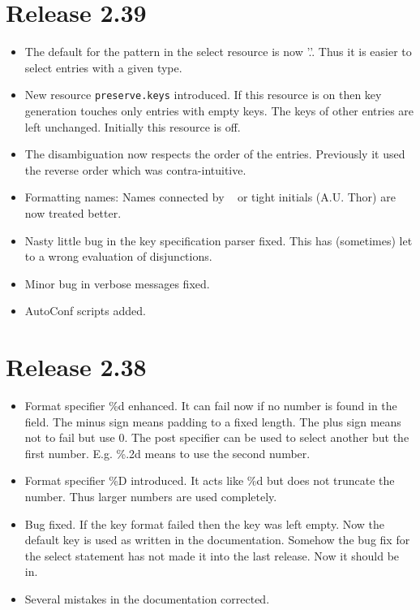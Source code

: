 \documentclass[11pt,a4paper]{scrartcl}
\newcommand\rsc[1]{\texttt{#1}}
\newenvironment{Release}[2]{%
  \def\tmp{#2}%
  \section*{Release #1 \ifx\tmp\empty\else{\normalsize[#2]}\fi}
  \begin{itemize}
}{\end{itemize}}
\newenvironment{Fix}[1]{\item }{}
\newenvironment{New}[1]{\item }{}
\newenvironment{Doc}[1]{\item }{}
\newenvironment{Update}[1]{\item }{}
\begin{document}
\begin{multicols}
 \begin{Release}{2.39}{}
  \begin{Update}{gene}
    The default for the pattern in the select resource is now '.'.
    Thus it is easier to select entries with a given type.
  \end{Update}
  \begin{New}{gene}
    New resource \rsc{preserve.keys} introduced. If this resource is on
    then key generation touches only entries with empty keys. The keys of
    other entries are left unchanged. Initially this resource is off.
  \end{New}
  \begin{Update}{gene}
    The disambiguation now respects the order of the entries. Previously it
    used the reverse order which was contra-intuitive.
  \end{Update}
  \begin{Update}{gene}
    Formatting names: Names connected by ~ or tight initials (A.U. Thor) are
    now treated better.
  \end{Update}
  \begin{Fix}{gene}
    Nasty little bug in the key specification parser fixed. This has
    (sometimes) let to a wrong evaluation of disjunctions.
  \end{Fix}
  \begin{Fix}{gene}
    Minor bug in verbose messages fixed.
  \end{Fix}
  \begin{New}{gene}
    AutoConf scripts added.
  \end{New}
 \end{Release}

 \begin{Release}{2.38}{}
  \begin{New}{gene}
    Format specifier \%d enhanced. It can fail now if no number is found in
    the field. The minus sign means padding to a fixed length. The plus sign
    means not to fail but use 0. The post specifier can be used to select
    another but the first number. E.g. \%.2d means to use the second number.
  \end{New}
  \begin{New}{gene}
    Format specifier \%D introduced. It acts like \%d but does not truncate
    the number. Thus larger numbers are used completely.
  \end{New}
  \begin{Fix}{gene}
    Bug fixed. If the key format failed then the key was left empty. Now the
    default key is used as written in the documentation. Somehow the bug fix
    for the select statement has not made it into the last release. Now it
    should be in.
  \end{Fix}
  \begin{Doc}{gene}
    Several mistakes in the documentation corrected.
  \end{Doc}
 \end{Release}


\end{multicols}
\end{document}
